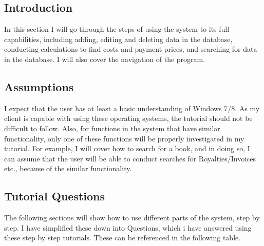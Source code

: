 \subsection{Introduction}

In this section I will go through the steps of using the system to its full capabilities, including adding, editing and deleting data in the database, conducting calculations to find costs and payment prices, and searching for data in the database. I will also cover the navigation of the program.

\subsection{Assumptions}

I expect that the user has at least a basic understanding of Windows 7/8. As my client is capable with using these operating systems, the tutorial should not be difficult to follow. Also, for functions in the system that have similar functionality, only one of these functions will be properly investigated in my tutorial. For example, I will cover how to search for a book, and in doing so, I can assume that the user will be able to conduct searches for Royalties/Invoices etc., because of the similar functionality.

\subsection{Tutorial Questions}

The following sections will show how to use different parts of the system, step by step. I have simplified these down into Questions, which i have answered using these step by step tutorials. These can be referenced in the following table.

